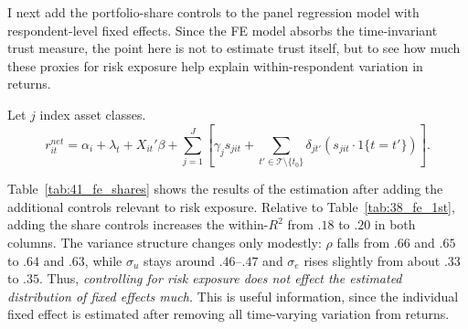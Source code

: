 \par I next add the portfolio-share controls to the panel regression model with respondent-level fixed effects. Since the FE model absorbs the time-invariant trust measure, the point here is not to estimate trust itself, but to see how much these proxies for risk exposure help explain within-respondent variation in returns.

\par Let  $j$ index asset classes.
\[
r^{net}_{it}
=
\alpha_i + \lambda_t + X_{it}'\beta
+ \sum_{j=1}^J
\left[
\gamma_j s_{jit}
+
\sum_{t' \in \mathcal{T} \setminus \{t_0\}} \delta_{jt'} \left( s_{jit} \cdot 1\{t = t'\} \right)
\right].
\]

\par Table~\ref{tab:41_fe_shares} shows the results of the estimation after adding the additional controls relevant to risk exposure. Relative to Table~\ref{tab:38_fe_1st}, adding the share controls increases the within-$R^2$ from $.18$ to $.20$ in both columns. The variance structure changes only modestly: $\rho$ falls from $.66$ and $.65$ to $.64$ and $.63$, while $\sigma_u$ stays around $.46$--$.47$ and $\sigma_e$ rises slightly from about $.33$ to $.35$. Thus, \textit{controlling for risk exposure does not effect the estimated distribution of fixed effects much.} This is useful information, since the individual fixed effect is estimated after removing all time-varying variation from returns.

\begin{table}[!t]
\centering
\caption{\textbf{Panel OLS with Individual Fixed Effects and Portfolio-Share Controls}}
\label{tab:41_fe_shares}
\begin{threeparttable}
\begingroup
\setlength{\tabcolsep}{2pt}%
\renewcommand{\arraystretch}{0.70}%
\scriptsize%
\resizebox{\textwidth}{!}{%
%
}%
\endgroup
\begin{tablenotes}[flushleft]
\scriptsize
\item {}%
\end{tablenotes}
\end{threeparttable}
\end{table}

